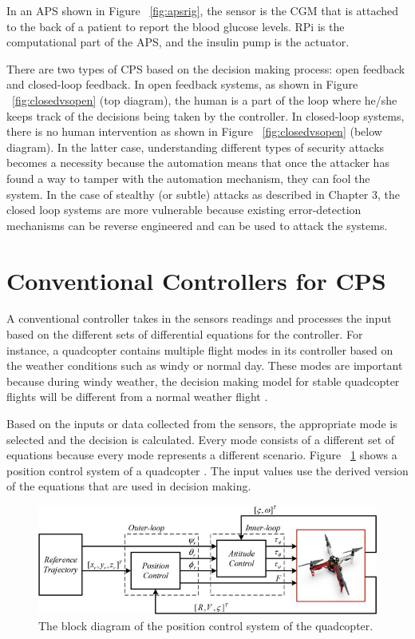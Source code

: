 In an \ac{APS} shown in Figure ~\ref{fig:apsrig}, the sensor is the \ac{CGM} that is attached to the back of a patient to report the blood glucose levels.  
\ac{RPi} is the computational part of the \ac{APS}, and the insulin pump is the actuator. 

There are two types of CPS based on the decision making process: open feedback and closed-loop feedback.
In open feedback systems, 
as shown in Figure ~\ref{fig:closedvsopen} (top diagram), the human is a part of the loop where he/she keeps track of the decisions being taken by the controller. 
In closed-loop systems, there is no human intervention 
as shown in Figure ~\ref{fig:closedvsopen} (below diagram). 
In the latter case, understanding different types of security attacks becomes a necessity because the automation means that once the attacker has found a way to tamper with the automation mechanism, they can fool the system. 
In the case of stealthy (or subtle) attacks as described in Chapter 3,  
the closed loop systems are more vulnerable because existing error-detection mechanisms can be reverse engineered and can be used to attack the systems. 

\section{Conventional Controllers for CPS}

A conventional controller takes in the sensors readings and processes the input based on the different sets of differential equations for the controller. 
For instance, a quadcopter contains multiple flight modes in its controller based on the weather conditions such as windy or normal day. 
These modes are important because during windy weather, the decision making model for stable quadcopter flights will be different from a normal weather flight \cite{inbook}. 

Based on the inputs or data collected from the sensors, the appropriate  mode is selected and the decision is calculated. 
Every mode consists of a different set of equations because every mode represents a different scenario.
Figure ~\ref{fig:controltheory} shows a position control system of a quadcopter \cite{inbook}. The input values use the derived version of the equations that are used in decision making. 

\begin{figure}
	\centering
	\includegraphics[width=0.7\linewidth]{Images/controltheory}
	\caption{The block diagram of the position control system of the quadcopter.
	}
	\label{fig:controltheory} 
\end{figure}


